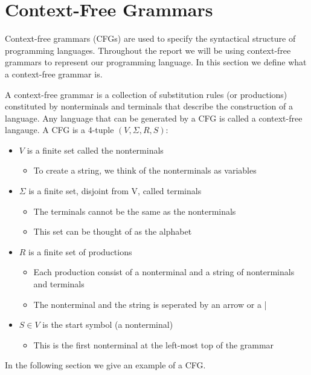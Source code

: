 \section{Context-Free Grammars}
\label{sec:cfg}
Context-free grammars (CFGs) are used to specify the syntactical structure of programming languages. Throughout the report we will be using context-free grammars to represent our programming language. In this section we define what a context-free grammar is. 

A context-free grammar is a collection of substitution rules (or productions) constituted by nonterminals and terminals that describe the construction of a language. Any language that can be generated by a CFG is called a context-free langauge. A CFG is a 4-tuple $(V, \Sigma, R, S)$:\cite[p. 100]{itttoc}

\begin{itemize}[noitemsep]
\item $V$ is a finite set called the nonterminals
\begin{itemize}[noitemsep]
\item To create a string, we think of the nonterminals as variables
\end{itemize}
\item $\Sigma$ is a finite set, disjoint from V, called terminals
\begin{itemize}[noitemsep]
\item The terminals cannot be the same as the nonterminals
\item This set can be thought of as the alphabet
\end{itemize}
\item $R$ is a finite set of productions
\begin{itemize}[noitemsep]
\item Each production consist of a nonterminal and a string of nonterminals and terminals
\item The nonterminal and the string is seperated by an arrow or a |
\end{itemize}
\item $S \in V$ is the start symbol (a nonterminal)
\begin{itemize}[noitemsep]
\item This is the first nonterminal at the left-most top of the grammar
\end{itemize}
\end{itemize} 

In the following section we give an example of a CFG.

